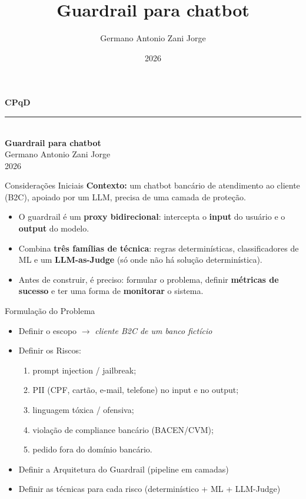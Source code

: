 \documentclass[aspectratio=169,11pt]{beamer}
\title{\bfseries Guardrail para chatbot}
\author{Germano Antonio Zani Jorge}
\date{2026}
\begin{document}
{
\begin{frame}[plain]
  \centering
  \vspace{1.2em}
  {\Large\bfseries\textcolor{cpqdteal!70!black}{CPqD}}\\[1em]
  {\color{cpqdteal}\rule{3cm}{1.5pt}}\\[2.5em]
  {\Huge\bfseries Guardrail para chatbot}\\[4em]
  {\large Germano Antonio Zani Jorge}\\[0.6em]
  {\large 2026}
\end{frame}}

\begin{frame}{Considerações Iniciais}
  \textbf{Contexto:} um chatbot bancário de atendimento ao cliente (B2C),
  apoiado por um LLM, precisa de uma camada de proteção.
  \vspace{1em}
  \begin{itemize}
    \item O guardrail é um \textbf{proxy bidirecional}: intercepta o
    \textbf{input} do usuário e o \textbf{output} do modelo.
    \vspace{0.5em}
    \item Combina \textbf{três famílias de técnica}: regras determinísticas,
    classificadores de ML e um \textbf{LLM-as-Judge} (só onde não há solução
    determinística).
    \vspace{0.5em}
    \item Antes de construir, é preciso: formular o problema, definir
    \textbf{métricas de sucesso} e ter uma forma de \textbf{monitorar} o sistema.
  \end{itemize}
\end{frame}

\begin{frame}{Formulação do Problema}
  \begin{itemize}
    \item Definir o escopo $\rightarrow$ \emph{cliente B2C de um banco fictício}
    \vspace{0.3em}
    \item Definir os Riscos:
    \begin{enumerate}\small
      \item prompt injection / jailbreak;
      \item PII (CPF, cartão, e-mail, telefone) no input e no output;
      \item linguagem tóxica / ofensiva;
      \item violação de compliance bancário (BACEN/CVM);
      \item pedido fora do domínio bancário.
    \end{enumerate}
    \item Definir a Arquitetura do Guardrail (pipeline em camadas)
    \item Definir as técnicas para cada risco (determinístico + ML + LLM-Judge)
  \end{itemize}
\end{frame}
\end{document}
